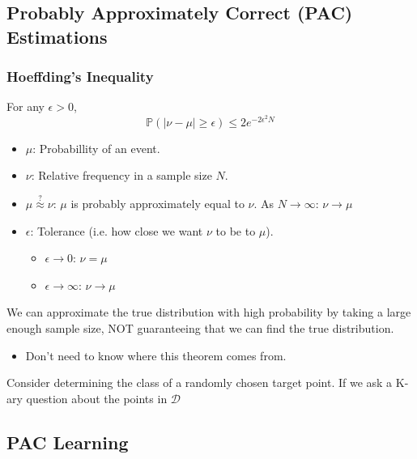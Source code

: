 \subsection{Probably Approximately Correct (PAC) Estimations}

\subsubsection{Hoeffding's Inequality}
\begin{definition}
    For any $\epsilon > 0$,
    \begin{equation}
        \mathbb{P}(|\nu - \mu| \geq \epsilon) \leq 2e^{-2\epsilon^2N}
    \end{equation}
    \begin{itemize}
        \item $\mu$: Probabillity of an event.
        \item $\nu$: Relative frequency in a sample size $N$.
        \item $\mu \overset{?}{\approx} \nu $: $\mu$ is probably approximately equal to $\nu$. As $N \rightarrow \infty$: $\nu \rightarrow \mu$
        \item $\epsilon$: Tolerance (i.e. how close we want $\nu$ to be to $\mu$).
        \begin{itemize}
            \item $\epsilon \rightarrow 0$: $\nu = \mu$
            \item $\epsilon \rightarrow \infty$: $\nu \rightarrow \mu$
        \end{itemize}
    \end{itemize}
\end{definition}

\begin{warning}
    We can approximate the true distribution with high probability by taking a large enough sample size, NOT guaranteeing that we can find the true distribution.
    \begin{itemize}
        \item Don't need to know where this theorem comes from.
    \end{itemize}
\end{warning}

Consider determining the class of a randomly chosen target point. If we ask a K-ary question about the points in $\mathcal{D}$

\subsection{PAC Learning}
